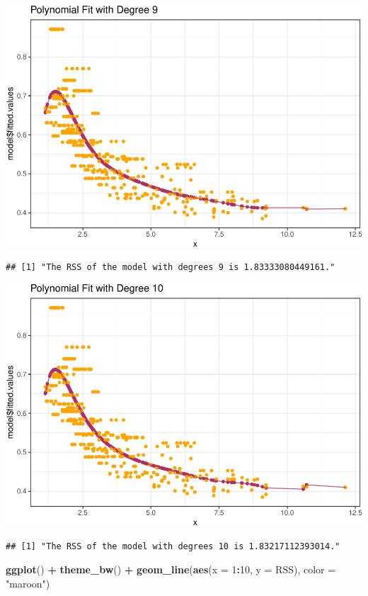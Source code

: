 \documentclass[]{article}
\newenvironment{Shaded}{\begin{snugshade}}{\end{snugshade}}
\newcommand{\KeywordTok}[1]{\textcolor[rgb]{0.13,0.29,0.53}{\textbf{#1}}}
\newcommand{\DataTypeTok}[1]{\textcolor[rgb]{0.13,0.29,0.53}{#1}}
\newcommand{\DecValTok}[1]{\textcolor[rgb]{0.00,0.00,0.81}{#1}}
\newcommand{\StringTok}[1]{\textcolor[rgb]{0.31,0.60,0.02}{#1}}
\newcommand{\OperatorTok}[1]{\textcolor[rgb]{0.81,0.36,0.00}{\textbf{#1}}}
\newcommand{\NormalTok}[1]{#1}
\begin{document}
\includegraphics{hw7_files/figure-latex/unnamed-chunk-6-9.pdf}

\begin{verbatim}
## [1] "The RSS of the model with degrees 9 is 1.83333080449161."
\end{verbatim}

\includegraphics{hw7_files/figure-latex/unnamed-chunk-6-10.pdf}

\begin{verbatim}
## [1] "The RSS of the model with degrees 10 is 1.83217112393014."
\end{verbatim}

\begin{Shaded}
\begin{Highlighting}[]
\KeywordTok{ggplot}\NormalTok{() }\OperatorTok{+}\StringTok{ }\KeywordTok{theme_bw}\NormalTok{() }\OperatorTok{+}\StringTok{ }\KeywordTok{geom_line}\NormalTok{(}\KeywordTok{aes}\NormalTok{(}\DataTypeTok{x =} \DecValTok{1}\OperatorTok{:}\DecValTok{10}\NormalTok{, }\DataTypeTok{y =}\NormalTok{ RSS), }\DataTypeTok{color =} \StringTok{"maroon"}\NormalTok{)}
\end{Highlighting}
\end{Shaded}
\end{document}
